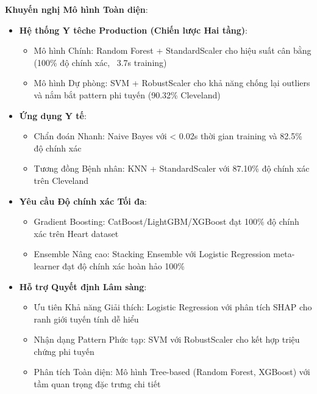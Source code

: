 \textbf{Khuyến nghị Mô hình Toàn diện}:
\begin{itemize}[leftmargin=*]
    \item \textbf{Hệ thống Y têche Production (Chiến lược Hai tầng)}:
    \begin{itemize}
        \item Mô hình Chính: Random Forest + StandardScaler cho hiệu suất cân bằng (100\% độ chính xác, ~3.7s training)
        \item Mô hình Dự phòng: SVM + RobustScaler cho khả năng chống lại outliers và nắm bắt pattern phi tuyến (90.32\% Cleveland)
    \end{itemize}
    
    \item \textbf{Ứng dụng Y tế}:
    \begin{itemize}
        \item Chẩn đoán Nhanh: Naive Bayes với < 0.02s thời gian training và 82.5\% độ chính xác
        \item Tương đồng Bệnh nhân: KNN + StandardScaler với 87.10\% độ chính xác trên Cleveland
    \end{itemize}
    
    \item \textbf{Yêu cầu Độ chính xác Tối đa}:
    \begin{itemize}
        \item Gradient Boosting: CatBoost/LightGBM/XGBoost đạt 100\% độ chính xác trên Heart dataset
        \item Ensemble Nâng cao: Stacking Ensemble với Logistic Regression meta-learner đạt độ chính xác hoàn hảo 100\%
    \end{itemize}
    
    \item \textbf{Hỗ trợ Quyết định Lâm sàng}:
    \begin{itemize}
        \item Ưu tiên Khả năng Giải thích: Logistic Regression với phân tích SHAP cho ranh giới tuyến tính dễ hiểu
        \item Nhận dạng Pattern Phức tạp: SVM với RobustScaler cho kết hợp triệu chứng phi tuyến
        \item Phân tích Toàn diện: Mô hình Tree-based (Random Forest, XGBoost) với tầm quan trọng đặc trưng chi tiết
    \end{itemize}
\end{itemize}

\FloatBarrier